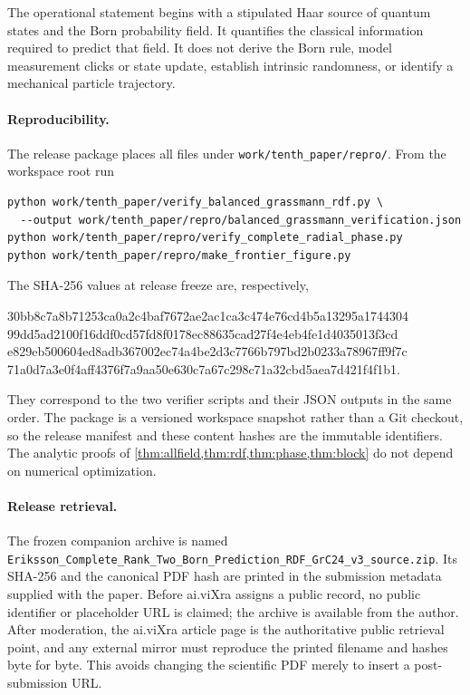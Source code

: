 \documentclass[11pt,a4paper]{article}
\begin{document}
The operational statement begins with a stipulated Haar source of quantum states and the Born probability field.  It quantifies the classical information required to predict that field.  It does not derive the Born rule, model measurement clicks or state update, establish intrinsic randomness, or identify a mechanical particle trajectory.

\paragraph{Reproducibility.}
The release package places all files under \texttt{work/tenth\_paper/repro/}.  From the workspace root run
\begin{verbatim}
python work/tenth_paper/verify_balanced_grassmann_rdf.py \
  --output work/tenth_paper/repro/balanced_grassmann_verification.json
python work/tenth_paper/repro/verify_complete_radial_phase.py
python work/tenth_paper/repro/make_frontier_figure.py
\end{verbatim}
The SHA-256 values at release freeze are, respectively,
\begin{center}\small\ttfamily
30bb8c7a8b71253ca0a2c4baf7672ae2ac1ca3c474e76cd4b5a13295a1744304\\
99dd5ad2100f16ddf0cd57fd8f0178ec88635cad27f4e4eb4fe1d4035013f3cd\\
e829eb500604ed8adb367002ec74a4be2d3c7766b797bd2b0233a78967ff9f7c\\
71a0d7a3e0f4aff4376f7a9aa50e630c7a67c298c71a32cbd5aea7d421f4f1b1.
\end{center}
They correspond to the two verifier scripts and their JSON outputs in the same order.  The package is a versioned workspace snapshot rather than a Git checkout, so the release manifest and these content hashes are the immutable identifiers.  The analytic proofs of \cref{thm:allfield,thm:rdf,thm:phase,thm:block} do not depend on numerical optimization.

\paragraph{Release retrieval.}
The frozen companion archive is named
\nolinkurl{Eriksson_Complete_Rank_Two_Born_Prediction_RDF_GrC24_v3_source.zip}.
Its SHA-256 and the canonical PDF hash are printed in the submission metadata supplied with the paper.  Before ai.viXra assigns a public record, no public identifier or placeholder URL is claimed; the archive is available from the author.  After moderation, the ai.viXra article page is the authoritative public retrieval point, and any external mirror must reproduce the printed filename and hashes byte for byte.  This avoids changing the scientific PDF merely to insert a post-submission URL.

\printbibliography
\end{document}
